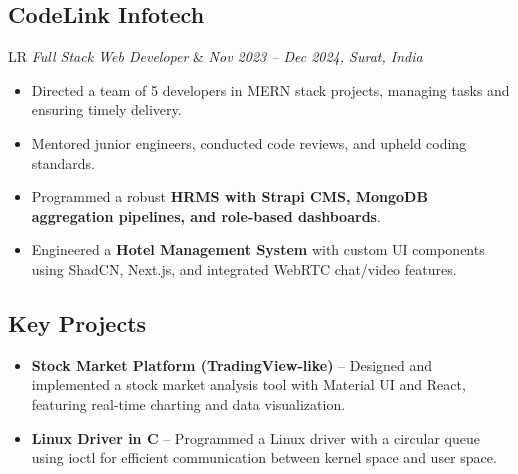 \documentclass[11pt,a4paper]{moderncv}
\newcommand*{\experienceentry}[5][1.5mm]{
    \subsection{#2} \vspace{-1.5mm}
    \begin{tabularx}{\textwidth}{LR}
        {\itshape #3} & {\itshape #4, #5}
    \end{tabularx}
    \par\addvspace{#1}
}
\begin{document}
\begin{minipage}[t]{0.62\textwidth}
\vspace{2.0mm}

\experienceentry{CodeLink Infotech}{Full Stack Web Developer}{Nov 2023 – Dec 2024}{Surat, India}

\begin{itemize}
    \item Directed a team of 5 developers in MERN stack projects, managing tasks and ensuring timely delivery.
    \item Mentored junior engineers, conducted code reviews, and upheld coding standards.
    \item Programmed a robust \textbf{HRMS with Strapi CMS, MongoDB aggregation pipelines, and role-based dashboards}.
    \item Engineered a \textbf{Hotel Management System} with custom UI components using ShadCN, Next.js, and integrated WebRTC chat/video features.
\end{itemize}
\vspace{2.0mm}

\subsection*{Key Projects}
\begin{itemize}
    \item \textbf{Stock Market Platform (TradingView-like)} – Designed and implemented a stock market analysis tool with Material UI and React, featuring real-time charting and data visualization.
    \item \textbf{Linux Driver in C} – Programmed a Linux driver with a circular queue using ioctl for efficient communication between kernel space and user space.
\end{itemize}



\end{minipage}
\hfill
\end{document}
